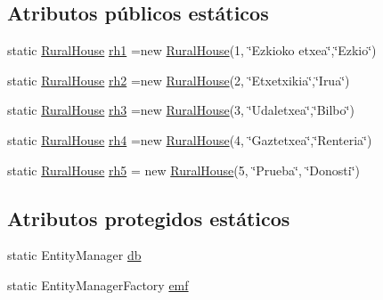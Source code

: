 \subsection*{Atributos públicos estáticos}
\begin{DoxyCompactItemize}
\item 
static \mbox{\hyperlink{classdomain_1_1_rural_house}{Rural\+House}} \mbox{\hyperlink{classdata_access_1_1_data_access_aa1663c162b42afb414590e1a5c9ef9bc}{rh1}} =new \mbox{\hyperlink{classdomain_1_1_rural_house}{Rural\+House}}(1, \char`\"{}Ezkioko etxea\char`\"{},\char`\"{}Ezkio\char`\"{})
\item 
static \mbox{\hyperlink{classdomain_1_1_rural_house}{Rural\+House}} \mbox{\hyperlink{classdata_access_1_1_data_access_a66369c2b00261f37b82a09dfa627a908}{rh2}} =new \mbox{\hyperlink{classdomain_1_1_rural_house}{Rural\+House}}(2, \char`\"{}Etxetxikia\char`\"{},\char`\"{}Iru{\ucr}a\char`\"{})
\item 
static \mbox{\hyperlink{classdomain_1_1_rural_house}{Rural\+House}} \mbox{\hyperlink{classdata_access_1_1_data_access_a8744023ed07b9b274bb555eb78d176fb}{rh3}} =new \mbox{\hyperlink{classdomain_1_1_rural_house}{Rural\+House}}(3, \char`\"{}Udaletxea\char`\"{},\char`\"{}Bilbo\char`\"{})
\item 
static \mbox{\hyperlink{classdomain_1_1_rural_house}{Rural\+House}} \mbox{\hyperlink{classdata_access_1_1_data_access_ae610cd3135e02e7e22239ff243c07a1b}{rh4}} =new \mbox{\hyperlink{classdomain_1_1_rural_house}{Rural\+House}}(4, \char`\"{}Gaztetxea\char`\"{},\char`\"{}Renteria\char`\"{})
\item 
static \mbox{\hyperlink{classdomain_1_1_rural_house}{Rural\+House}} \mbox{\hyperlink{classdata_access_1_1_data_access_a0359904deb5a93ce8049a3ce3343c541}{rh5}} = new \mbox{\hyperlink{classdomain_1_1_rural_house}{Rural\+House}}(5, \char`\"{}Prueba\char`\"{}, \char`\"{}Donosti\char`\"{})
\end{DoxyCompactItemize}
\subsection*{Atributos protegidos estáticos}
\begin{DoxyCompactItemize}
\item 
static Entity\+Manager \mbox{\hyperlink{classdata_access_1_1_data_access_a0920d5a9c61bdae39ef950d6e4e187e4}{db}}
\item 
static Entity\+Manager\+Factory \mbox{\hyperlink{classdata_access_1_1_data_access_a158d2718ef5a80f4f296b14937cc1775}{emf}}
\end{DoxyCompactItemize}


